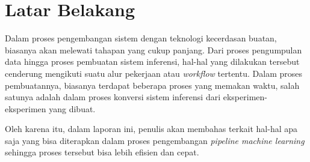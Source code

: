 \section{Latar Belakang}

Dalam proses pengembangan sistem dengan teknologi kecerdasan buatan, biasanya akan melewati tahapan yang cukup panjang.
Dari proses pengumpulan data hingga proses pembuatan sistem inferensi, hal-hal yang dilakukan tersebut cenderung mengikuti suatu alur pekerjaan atau \textit{workflow} tertentu.
Dalam proses pembuatannya, biasanya terdapat beberapa proses yang memakan waktu, salah satunya adalah dalam proses konversi sistem inferensi dari eksperimen-eksperimen yang dibuat.

Oleh karena itu, dalam laporan ini, penulis akan membahas terkait hal-hal apa saja yang bisa diterapkan dalam proses pengembangan \textit{pipeline machine learning} sehingga proses tersebut bisa lebih efisien dan cepat.